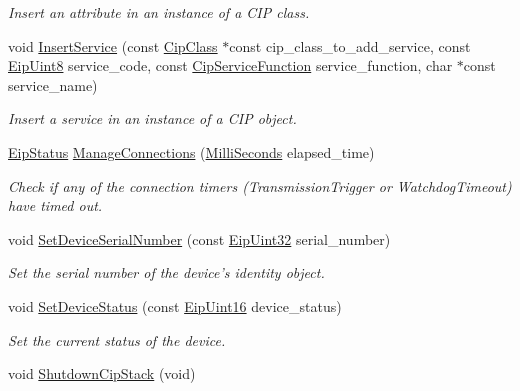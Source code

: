\begin{DoxyCompactItemize}
\begin{DoxyCompactList}\small\item\em \-Insert an attribute in an instance of a \-C\-I\-P class. \end{DoxyCompactList}\item 
void \hyperlink{group__CIP__API_ga35f639b135ec3c3903f49fd65daed307}{\-Insert\-Service} (const \hyperlink{ciptypes_8h_a175191808b8fac50b47d9bbc9edc6051}{\-Cip\-Class} $\ast$const cip\-\_\-class\-\_\-to\-\_\-add\-\_\-service, const \hyperlink{typedefs_8h_aa0c108ee762a27720919a4634643040e}{\-Eip\-Uint8} service\-\_\-code, const \hyperlink{ciptypes_8h_af7606d2a9b86977aa0ac4ec9ccec3701}{\-Cip\-Service\-Function} service\-\_\-function, char $\ast$const service\-\_\-name)
\begin{DoxyCompactList}\small\item\em \-Insert a service in an instance of a \-C\-I\-P object. \end{DoxyCompactList}\item 
\hyperlink{typedefs_8h_a3dcc5f7837c120360f8cc88a76781709}{\-Eip\-Status} \hyperlink{group__CIP__API_ga9f57b09260efb5bfb188b9d0ca0c6091}{\-Manage\-Connections} (\hyperlink{typedefs_8h_a2972c9424f18b12265ca35d0548da82a}{\-Milli\-Seconds} elapsed\-\_\-time)
\begin{DoxyCompactList}\small\item\em \-Check if any of the connection timers (\-Transmission\-Trigger or \-Watchdog\-Timeout) have timed out. \end{DoxyCompactList}\item 
void \hyperlink{group__CIP__API_ga696952d9dbc1b6fdedf517aa55f94323}{\-Set\-Device\-Serial\-Number} (const \hyperlink{typedefs_8h_abf2dd49262551294eb990ef8746a2767}{\-Eip\-Uint32} serial\-\_\-number)
\begin{DoxyCompactList}\small\item\em \-Set the serial number of the device's identity object. \end{DoxyCompactList}\item 
void \hyperlink{group__CIP__API_ga2113be94f1eab4f25770d975abe6015c}{\-Set\-Device\-Status} (const \hyperlink{typedefs_8h_ac1b4cfa25b4f5def62f23b455dd395d8}{\-Eip\-Uint16} device\-\_\-status)
\begin{DoxyCompactList}\small\item\em \-Set the current status of the device. \end{DoxyCompactList}\item 
void \hyperlink{group__CIP__API_gaa57b527530adc2acda6febc500fd6831}{\-Shutdown\-Cip\-Stack} (void)

\end{DoxyCompactItemize}
